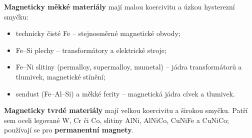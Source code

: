 \textbf{Magneticky měkké materiály} mají malou koercivitu a úzkou hysterezní smyčku:
\begin{itemize}
\item technicky čisté Fe -- stejnosměrné magnetické obvody;
\item Fe--Si plechy -- transformátory a elektrické stroje;
\item Fe--Ni slitiny (permalloy, supermalloy, mumetal) -- jádra transformátorů a tlumivek, magnetické stínění;
\item sendust (Fe--Al--Si) a měkké ferity -- magnetická jádra cívek a tlumivek.
\end{itemize}
\textbf{Magneticky tvrdé materiály} mají velkou koercivitu a širokou smyčku. Patří sem oceli legované W, Cr či Co, slitiny AlNi, AlNiCo, CuNiFe a CuNiCo; používají se pro \textbf{permanentní magnety}.
